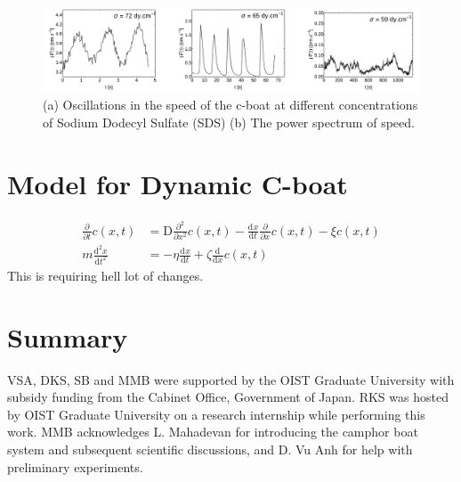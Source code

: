 \documentclass[aps, twocolumn, floatfix, superscriptaddress]{revtex4}
\newcommand{\tdc}[3][]{\frac{\mathrm{d}^{#1}#2}{\mathrm{d}#3^{#1}}} %
\newcommand{\pdc}[3][]{\frac{\partial^{#1} #2}{\partial #3^{#1}}} %
\begin{document}
\begin{figure}[ht]
    \begin{center}
       \includegraphics[scale=0.1]{figure8.pdf}
    \end{center}
    \caption{(a) Oscillations in the speed of the c-boat at different concentrations of Sodium Dodecyl Sulfate (SDS) (b) The power spectrum of speed.}
    \label{fig:absvsds}
\end{figure}
\section{Model for Dynamic C-boat}
\begin{align}
\pdc{}{t}c(x, t) &= \mathrm{D} \pdc[2]{}{x}c(x, t) - \tdc{x}{t} \pdc{}{x}c(x, t)  - \xi c(x, t) \\
m\tdc[2]{x}{t} &= -\eta \tdc{x}{t} + \zeta \tdc{}{x}c(x,t) 
\end{align}
This is requiring hell lot of changes.

\section{Summary}
\label{sec:summary}


\acknowledgments
VSA, DKS, SB and MMB were supported by the OIST Graduate University with subsidy funding from the Cabinet Office, Government of Japan. RKS was hosted by OIST Graduate University on a research internship while performing this work. MMB acknowledges L. Mahadevan for introducing the camphor boat system and subsequent scientific discussions, and D. Vu Anh for help with preliminary experiments.


\end{document}

